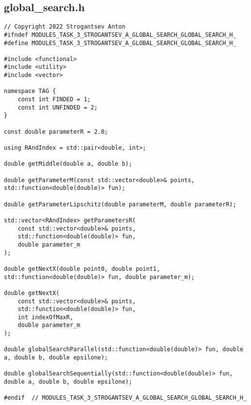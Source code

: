 \documentclass[14pt, a4paper]{extarticle}
\begin{document}
	\subsection{global\_search.h}
	\begin{lstlisting}
// Copyright 2022 Strogantsev Anton
#ifndef MODULES_TASK_3_STROGANTSEV_A_GLOBAL_SEARCH_GLOBAL_SEARCH_H_
#define MODULES_TASK_3_STROGANTSEV_A_GLOBAL_SEARCH_GLOBAL_SEARCH_H_

#include <functional>
#include <utility>
#include <vector>

namespace TAG {
    const int FINDED = 1;
    const int UNFINDED = 2;
}

const double parameterR = 2.0;

using RAndIndex = std::pair<double, int>;

double getMiddle(double a, double b);

double getParameterM(const std::vector<double>& points, std::function<double(double)> fun);

double getParameterLipschitz(double parameterM, double parameterR);

std::vector<RAndIndex> getParametersR(
    const std::vector<double>& points,
    std::function<double(double)> fun,
    double parameter_m
);

double getNextX(double point0, double point1, std::function<double(double)> fun, double parameter_m);

double getNextX(
    const std::vector<double>& points,
    std::function<double(double)> fun,
    int indexOfMaxR,
    double parameter_m
);

double globalSearchParallel(std::function<double(double)> fun, double a, double b, double epsilone);

double globalSearchSequentially(std::function<double(double)> fun, double a, double b, double epsilone);

#endif  // MODULES_TASK_3_STROGANTSEV_A_GLOBAL_SEARCH_GLOBAL_SEARCH_H_
	\end{lstlisting}
	\newpage
\end{document}
